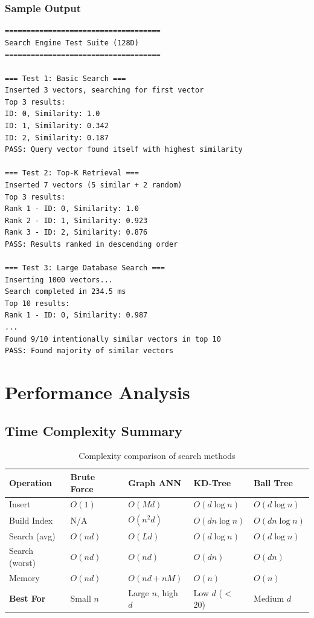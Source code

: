 \documentclass[12pt,a4paper]{article}
\begin{document}
\subsubsection{Sample Output}
\begin{verbatim}
====================================
Search Engine Test Suite (128D)
====================================

=== Test 1: Basic Search ===
Inserted 3 vectors, searching for first vector
Top 3 results:
ID: 0, Similarity: 1.0
ID: 1, Similarity: 0.342
ID: 2, Similarity: 0.187
PASS: Query vector found itself with highest similarity

=== Test 2: Top-K Retrieval ===
Inserted 7 vectors (5 similar + 2 random)
Top 3 results:
Rank 1 - ID: 0, Similarity: 1.0
Rank 2 - ID: 1, Similarity: 0.923
Rank 3 - ID: 2, Similarity: 0.876
PASS: Results ranked in descending order

=== Test 3: Large Database Search ===
Inserting 1000 vectors...
Search completed in 234.5 ms
Top 10 results:
Rank 1 - ID: 0, Similarity: 0.987
...
Found 9/10 intentionally similar vectors in top 10
PASS: Found majority of similar vectors
\end{verbatim}

\section{Performance Analysis}

\subsection{Time Complexity Summary}

\begin{table}[h]
\centering
\begin{tabular}{@{}lllll@{}}
\toprule
\textbf{Operation} & \textbf{Brute Force} & \textbf{Graph ANN} & \textbf{KD-Tree} & \textbf{Ball Tree} \\ \midrule
Insert             & $O(1)$               & $O(Md)$            & $O(d\log n)$     & $O(d\log n)$      \\
Build Index        & N/A                  & $O(n^2d)$          & $O(dn\log n)$    & $O(dn\log n)$     \\
Search (avg)       & $O(nd)$              & $O(Ld)$            & $O(d\log n)$     & $O(d\log n)$      \\
Search (worst)     & $O(nd)$              & $O(nd)$            & $O(dn)$          & $O(dn)$           \\
Memory             & $O(nd)$              & $O(nd + nM)$       & $O(n)$           & $O(n)$            \\ 
\textbf{Best For}  & Small $n$            & Large $n$, high $d$ & Low $d$ ($<$20) & Medium $d$        \\ \bottomrule
\end{tabular}
\caption{Complexity comparison of search methods}
\end{table}
\end{document}
